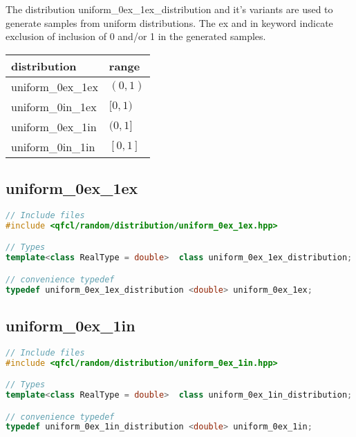 %
The distribution uniform\_0ex\_1ex\_distribution and it's variants are used to generate samples
from uniform distributions. The ex and in keyword indicate exclusion of inclusion of 0 and/or 1 in the generated 
samples.

\begin{tabular}{ | l | l | }
  \hline
  distribution & range \\
  \hline                        
  uniform\_0ex\_1ex & $(0,1)$ \\
  uniform\_0in\_1ex & $[0,1)$ \\
  uniform\_0ex\_1in & $(0,1]$ \\
  uniform\_0in\_1in & $[0,1]$ \\
  \hline  
\end{tabular}

%
\subsection{uniform\_0ex\_1ex}
\begin{lstlisting}[language=C++]
// Include files
#include <qfcl/random/distribution/uniform_0ex_1ex.hpp>

// Types
template<class RealType = double>  class uniform_0ex_1ex_distribution;

// convenience typedef
typedef uniform_0ex_1ex_distribution <double> uniform_0ex_1ex;
\end{lstlisting}


%
\subsection{uniform\_0ex\_1in}
\begin{lstlisting}[language=C++]
// Include files
#include <qfcl/random/distribution/uniform_0ex_1in.hpp>

// Types
template<class RealType = double>  class uniform_0ex_1in_distribution;

// convenience typedef
typedef uniform_0ex_1in_distribution <double> uniform_0ex_1in;
\end{lstlisting}


